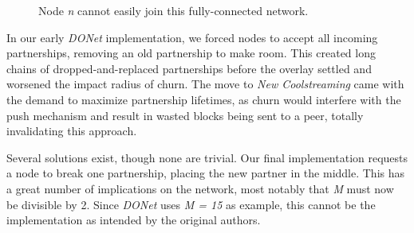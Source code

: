 \documentclass[12pt,a4paper]{article}
\begin{document}
\begin{figure}[!ht]
	\centering
	\caption{Node \textit{n} cannot easily join this fully-connected network.}
	\label{fig1}
\end{figure}

In our early \textit{DONet} implementation, we forced nodes to accept all incoming partnerships, removing an old partnership to make room. This created long chains of dropped-and-replaced partnerships before the overlay settled and worsened the impact radius of churn. The move to \textit{New Coolstreaming} came with the demand to maximize partnership lifetimes, as churn would interfere with the push mechanism and result in wasted blocks being sent to a peer, totally invalidating this approach.

Several solutions exist, though none are trivial. Our final implementation requests a node to break one partnership, placing the new partner in the middle. This has a great number of implications on the network, most notably that \textit{M} must now be divisible by 2. Since \textit{DONet} uses \textit{M = 15} as example, this cannot be the implementation as intended by the original authors.
\end{document}
